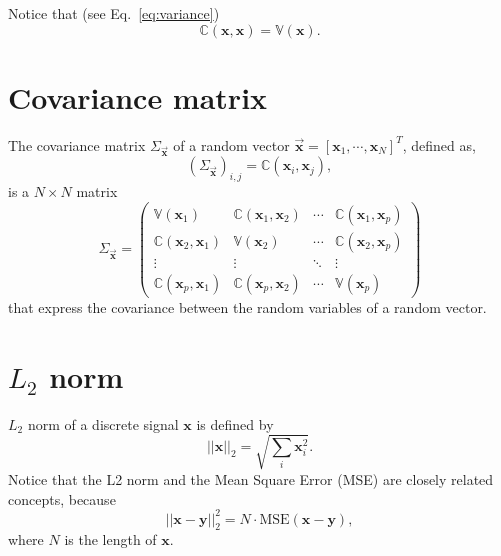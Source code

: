 Notice that (see Eq.~\ref{eq:variance})
\begin{equation}
  \mathbb{C}(\mathbf{x}, \mathbf{x}) = \mathbb{V}(\mathbf{x}).
\end{equation}


\section{Covariance matrix}
\label{sec:covariance_matrix}

The covariance matrix $\Sigma_{\overrightarrow{\mathbf{x}}}$ of a random vector $\overrightarrow{\mathbf{x}}=[\mathbf{x}_1,\cdots,\mathbf{x}_N]^T$, defined as,
\begin{equation}
  (\Sigma_{\overrightarrow{\mathbf{x}}})_{i,j}=\mathbb{C}(\mathbf{x}_i,\mathbf{x}_j),
\end{equation}
is a $N\times N$ matrix
\begin{equation}
\Sigma_{\overrightarrow{\mathbf{x}}} = 
\begin{pmatrix}
\mathbb{V}(\mathbf{x}_1) & \mathbb{C}(\mathbf{x}_1, \mathbf{x}_2) & \cdots & \mathbb{C}(\mathbf{x}_1, \mathbf{x}_p) \\
\mathbb{C}(\mathbf{x}_2, \mathbf{x}_1) & \mathbb{V}(\mathbf{x}_2) & \cdots & \mathbb{C}(\mathbf{x}_2, \mathbf{x}_p) \\
\vdots & \vdots & \ddots & \vdots \\
\mathbb{C}(\mathbf{x}_p, \mathbf{x}_1) & \mathbb{C}(\mathbf{x}_p, \mathbf{x}_2) & \cdots & \mathbb{V}(\mathbf{x}_p)
\end{pmatrix}
\end{equation}
that express the covariance between the random variables of a random vector.


\section{$L_2$ norm}
\label{sec:L2_norm}

$L_2$ norm of a discrete signal $\mathbf{x}$ is defined by
\begin{equation}
  ||\mathbf{x}||_2 = \sqrt{\sum_i\mathbf{x}_i^2}.
\end{equation}
Notice that the L2 norm and the Mean Square Error (MSE) are closely
related concepts, because
\begin{equation}
  ||\mathbf{x} - \mathbf{y}||_2^2 = N\cdot\text{MSE}(\mathbf{x} - \mathbf{y}),
\end{equation}
where $N$ is the length of $\mathbf{x}$.


